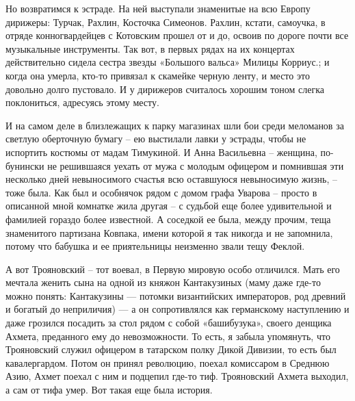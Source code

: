 Но возвратимся к эстраде. На ней выступали знаменитые на всю Европу дирижеры:
Турчак, Рахлин, Косточка Симеонов. Рахлин, кстати, самоучка, в отряде
конногвардейцев с Котовским прошел от и до, освоив по дороге почти все
музыкальные инструменты. Так вот, в первых рядах на их концертах действительно
сидела сестра звезды «Большого вальса» Милицы Корриус.; и когда она умерла,
кто-то привязал к скамейке черную ленту, и место это довольно долго пустовало.
И у дирижеров считалось хорошим тоном слегка поклониться, адресуясь этому
месту.

И на самом деле в близлежащих к парку магазинах шли бои среди меломанов за
светлую оберточную бумагу – ею выстилали лавки у эстрады, чтобы не испортить
костюмы от мадам Тимукиной. И Анна Васильевна – женщина, по-бунински не
решившаяся уехать от мужа с молодым офицером и помнившая эти несколько дней
невыносимого счастья всю оставшуюся невыносимую жизнь, – тоже была. Как был и
особнячок рядом с домом графа Уварова – просто в описанной мной комнатке жила
другая  – с судьбой еще более удивительной и фамилией гораздо более известной.
А соседкой ее была, между прочим, теща знаменитого партизана Ковпака, имени
которой я так никогда и не запомнила, потому что бабушка и ее приятельницы
неизменно звали тещу Феклой.

А вот Трояновский – тот воевал, в Первую мировую особо отличился. Мать его
мечтала женить сына на одной из княжон Кантакузиных (маму даже где-то можно
понять: Кантакузины — потомки византийских императоров, род древний и богатый
до неприличия) — а он сопротивлялся как германскому наступлению и даже грозился
посадить за стол рядом с собой «башибузука», своего денщика Ахмета, преданного
ему до невозможности. То есть, я забыла упомянуть, что Трояновский служил
офицером в татарском полку Дикой Дивизии, то есть был кавалергардом. Потом он
принял революцию, поехал комиссаром в Среднюю Азию, Ахмет поехал с ним и
подцепил где-то тиф. Трояновский Ахмета выходил, а сам от тифа умер. Вот такая
еще была история. 

